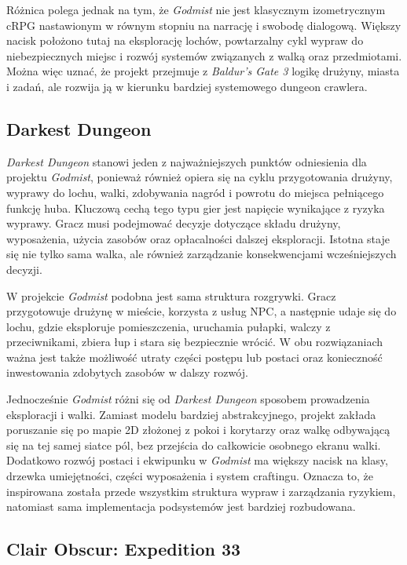 Różnica polega jednak na tym, że \emph{Godmist} nie jest klasycznym izometrycznym cRPG nastawionym w równym stopniu na narrację i swobodę dialogową. Większy nacisk położono tutaj na eksplorację lochów, powtarzalny cykl wypraw do niebezpiecznych miejsc i rozwój systemów związanych z walką oraz przedmiotami. Można więc uznać, że projekt przejmuje z \emph{Baldur's Gate 3} logikę drużyny, miasta i zadań, ale rozwija ją w kierunku bardziej systemowego dungeon crawlera.

\subsection{Darkest Dungeon}
\label{subsec:darkest-dungeon}

\emph{Darkest Dungeon} stanowi jeden z najważniejszych punktów odniesienia dla projektu \emph{Godmist}, ponieważ również opiera się na cyklu przygotowania drużyny, wyprawy do lochu, walki, zdobywania nagród i powrotu do miejsca pełniącego funkcję huba. Kluczową cechą tego typu gier jest napięcie wynikające z ryzyka wyprawy. Gracz musi podejmować decyzje dotyczące składu drużyny, wyposażenia, użycia zasobów oraz opłacalności dalszej eksploracji. Istotna staje się nie tylko sama walka, ale również zarządzanie konsekwencjami wcześniejszych decyzji.

W projekcie \emph{Godmist} podobna jest sama struktura rozgrywki. Gracz przygotowuje drużynę w mieście, korzysta z usług NPC, a następnie udaje się do lochu, gdzie eksploruje pomieszczenia, uruchamia pułapki, walczy z przeciwnikami, zbiera łup i stara się bezpiecznie wrócić. W obu rozwiązaniach ważna jest także możliwość utraty części postępu lub postaci oraz konieczność inwestowania zdobytych zasobów w dalszy rozwój.

Jednocześnie \emph{Godmist} różni się od \emph{Darkest Dungeon} sposobem prowadzenia eksploracji i walki. Zamiast modelu bardziej abstrakcyjnego, projekt zakłada poruszanie się po mapie 2D złożonej z pokoi i korytarzy oraz walkę odbywającą się na tej samej siatce pól, bez przejścia do całkowicie osobnego ekranu walki. Dodatkowo rozwój postaci i ekwipunku w \emph{Godmist} ma większy nacisk na klasy, drzewka umiejętności, części wyposażenia i system craftingu. Oznacza to, że inspirowana została przede wszystkim struktura wypraw i zarządzania ryzykiem, natomiast sama implementacja podsystemów jest bardziej rozbudowana.

\subsection{Clair Obscur: Expedition 33}
\label{subsec:coe33}

